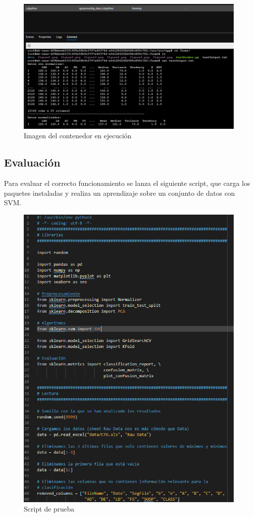 
\begin{figure}[H]\center\includegraphics[width=.95\linewidth]{img/python/p9.png}\caption{Imagen del contenedor en ejecución}\end{figure}


\subsection{Evaluación}

Para evaluar el correcto funcionamiento se lanza el siguiente script, que carga los paquetes instaladas y realiza un aprendizaje sobre un conjunto de datos con SVM.

\begin{figure}[H]\center\includegraphics[width=.95\linewidth]{img/python/p6.png}\caption{Script de prueba}\end{figure}